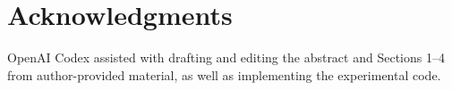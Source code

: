 \section{Acknowledgments}

\label{acknowledgments}

OpenAI Codex assisted with drafting and editing the abstract and Sections 1--4 from author-provided material, as well as implementing the experimental code.
